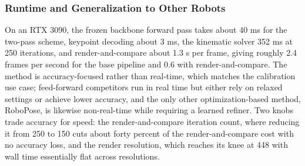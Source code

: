 \subsubsection{Runtime and Generalization to Other Robots}
On an RTX 3090, the frozen backbone forward pass takes about 40 ms for the two-pass scheme, keypoint decoding about 3 ms, the kinematic solver 352 ms at 250 iterations, and render-and-compare about 1.3 s per frame, giving roughly 2.4 frames per second for the base pipeline and 0.6 with render-and-compare. The method is accuracy-focused rather than real-time, which matches the calibration use case; feed-forward competitors run in real time but either rely on relaxed settings or achieve lower accuracy, and the only other optimization-based method, RoboPose, is likewise non-real-time while requiring a learned refiner. Two knobs trade accuracy for speed: the render-and-compare iteration count, where reducing it from 250 to 150 cuts about forty percent of the render-and-compare cost with no accuracy loss, and the render resolution, which reaches its knee at 448 with wall time essentially flat across resolutions.

